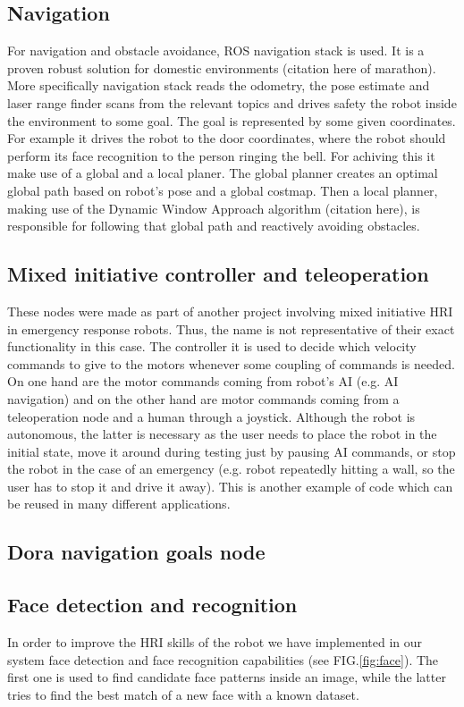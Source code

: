 \documentclass[conference]{IEEEtran}
\begin{document}
\subsection{\label{sec:navig}Navigation}
For navigation and obstacle avoidance, ROS navigation stack is used. It is a proven robust solution for domestic environments (citation here of marathon). More specifically navigation stack reads the odometry, the pose estimate and laser range finder scans from the relevant topics and drives safety the robot inside the environment to some goal. The goal is represented by some given coordinates. For example it drives the robot to the door coordinates, where the robot should perform its face recognition to the person ringing the bell. For achiving this it make use of a global and a local planer. The global planner creates an optimal global path based on robot's pose and a global costmap. Then a local planner, making use of the Dynamic Window Approach algorithm (citation here), is responsible for following that global path and reactively avoiding obstacles.

\subsection{Mixed initiative controller and teleoperation}
These nodes were made as part of another project involving mixed initiative HRI in emergency response robots. Thus, the name is not representative of their exact functionality in this case. The controller it is used to decide which velocity commands to give to the motors whenever some coupling of commands is needed. On one hand are the motor commands coming from robot's AI (e.g. AI navigation) and on the other hand are motor commands coming from a teleoperation node and a human through a joystick. Although the robot is autonomous, the latter is necessary as the user needs to place the robot in the initial state, move it around during testing just by pausing AI commands, or stop the robot in the case of an emergency (e.g. robot repeatedly hitting a wall, so the user has to stop it and drive it away).  This is another example of code which can be reused in many different applications.

\subsection{Dora navigation goals node}

\subsection{\label{sec:vision}Face detection and recognition}
In order to improve the HRI skills of the robot we have implemented in our system face detection and face recognition capabilities (see FIG.\ref{fig:face}). The first one is used to find candidate face patterns inside an image, while the latter tries to find the best match of a new face with a known dataset.
\end{document}
